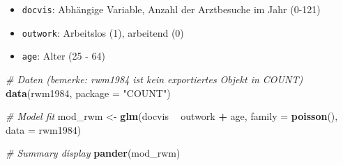 \documentclass[ngerman,a4paper,]{scrartcl}
\newenvironment{Shaded}{\begin{snugshade}}{\end{snugshade}}
\newcommand{\CommentTok}[1]{\textcolor[rgb]{0.56,0.35,0.01}{\textit{#1}}}
\newcommand{\DataTypeTok}[1]{\textcolor[rgb]{0.13,0.29,0.53}{#1}}
\newcommand{\KeywordTok}[1]{\textcolor[rgb]{0.13,0.29,0.53}{\textbf{#1}}}
\newcommand{\NormalTok}[1]{#1}
\newcommand{\OperatorTok}[1]{\textcolor[rgb]{0.81,0.36,0.00}{\textbf{#1}}}
\newcommand{\StringTok}[1]{\textcolor[rgb]{0.31,0.60,0.02}{#1}}
\providecommand{\tightlist}{%
  \setlength{\itemsep}{0pt}\setlength{\parskip}{0pt}}
\theoremstyle{definition}
\theoremstyle{definition}
\theoremstyle{definition}
\theoremstyle{remark}
\begin{document}
\begin{itemize}
\tightlist
\item
  \texttt{docvis}: Abhängige Variable, Anzahl der Arztbesuche im Jahr (0-121)
\item
  \texttt{outwork}: Arbeitslos (1), arbeitend (0)
\item
  \texttt{age}: Alter (25 - 64)
\end{itemize}

\begin{Shaded}
\begin{Highlighting}[]
\CommentTok{# Daten (bemerke: rwm1984 ist kein exportiertes Objekt in COUNT)}
\KeywordTok{data}\NormalTok{(rwm1984, }\DataTypeTok{package =} \StringTok{"COUNT"}\NormalTok{)}

\CommentTok{# Model fit}
\NormalTok{mod_rwm <-}\StringTok{ }\KeywordTok{glm}\NormalTok{(docvis }\OperatorTok{~}\StringTok{ }\NormalTok{outwork }\OperatorTok{+}\StringTok{ }\NormalTok{age, }\DataTypeTok{family =} \KeywordTok{poisson}\NormalTok{(), }\DataTypeTok{data =}\NormalTok{ rwm1984)}

\CommentTok{# Summary display}
\KeywordTok{pander}\NormalTok{(mod_rwm)}
\end{Highlighting}
\end{Shaded}
\end{document}
